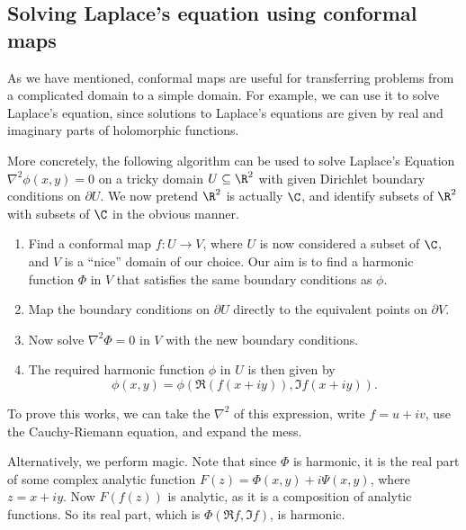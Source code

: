 \documentclass[a4paper]{article}
\begin{document}
\subsection{Solving Laplace's equation using conformal maps}
As we have mentioned, conformal maps are useful for transferring problems from a complicated domain to a simple domain. For example, we can use it to solve Laplace's equation, since solutions to Laplace's equations are given by real and imaginary parts of holomorphic functions.

More concretely, the following algorithm can be used to solve Laplace's Equation $\nabla^2 \phi(x, y) = 0$ on a tricky domain $U \subseteq \R^2$ with given Dirichlet boundary conditions on $\partial U$. We now pretend $\R^2$ is actually $\C$, and identify subsets of $\R^2$ with subsets of $\C$ in the obvious manner.
\begin{enumerate}
  \item Find a conformal map $f: U \to V$, where $U$ is now considered a subset of $\C$, and $V$ is a ``nice'' domain of our choice. Our aim is to find a harmonic function $\Phi$ in $V$ that satisfies the same boundary conditions as $\phi$.
  \item Map the boundary conditions on $\partial U$ directly to the equivalent points on $\partial V$.
  \item Now solve $\nabla^2 \Phi = 0$ in $V$ with the new boundary conditions.
  \item The required harmonic function $\phi$ in $U$ is then given by
    \[
      \phi(x, y) = \phi(\Re(f(x + iy)), \Im f(x + iy)).
    \]
\end{enumerate}
To prove this works, we can take the $\nabla^2$ of this expression, write $f = u + iv$, use the Cauchy-Riemann equation, and expand the mess.

Alternatively, we perform magic. Note that since $\Phi$ is harmonic, it is the real part of some complex analytic function $F(z) = \Phi(x, y) + i \Psi(x, y)$, where $z = x + iy$. Now $F(f(z))$ is analytic, as it is a composition of analytic functions. So its real part, which is $\Phi(\Re f, \Im f)$, is harmonic.
\end{document}
